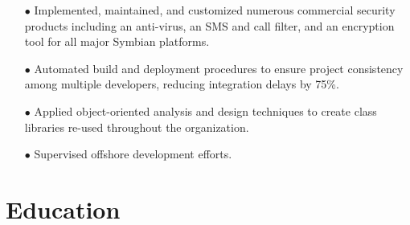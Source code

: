 \documentclass[12pt,letter,roman]{moderncv}
\begin{document}
\begin{itemize}

    \item[$\bullet$] Implemented, maintained, and customized numerous commercial security
        products including an anti-virus, an SMS and call filter, and an
        encryption tool for all major Symbian platforms.

    \item[$\bullet$] Automated build and deployment procedures to ensure project
        consistency among multiple developers, reducing integration delays by
        75\%.

    \item[$\bullet$] Applied object-oriented analysis and design techniques to create class
        libraries re-used throughout the organization.

    \item[$\bullet$] Supervised offshore development efforts.

\end{itemize}

\section{Education}

\end{document}
